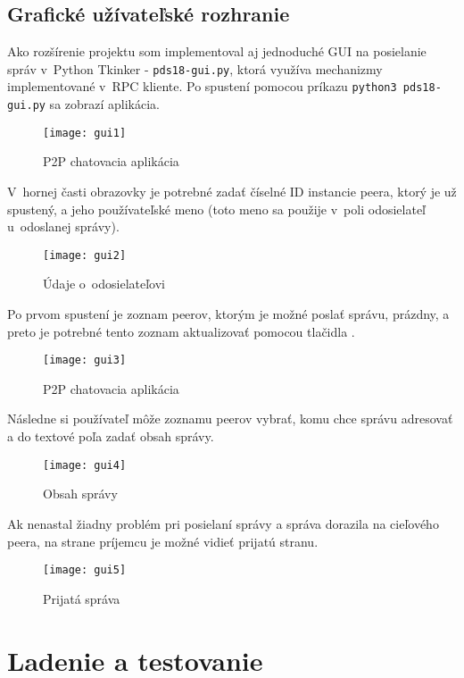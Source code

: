 \section{Grafické užívateľské rozhranie}

Ako rozšírenie projektu som implementoval aj jednoduché GUI na posielanie správ v~Python Tkinker \-- \texttt{pds18-gui.py}, ktorá využíva mechanizmy implementované v~RPC kliente. Po spustení pomocou príkazu \texttt{python3 pds18-gui.py} sa zobrazí aplikácia.

\begin{figure}[H]
	\texttt{[image: gui1]}
	\caption{P2P chatovacia aplikácia}
\end{figure}

V~hornej časti obrazovky je potrebné zadať číselné ID instancie peera, ktorý je už spustený, a jeho používateľské meno (toto meno sa použije v~poli odosielateľ u~odoslanej správy). 

\begin{figure}[H]
	\texttt{[image: gui2]}
	\caption{Údaje o~odosielateľovi}
\end{figure}

Po prvom spustení je zoznam peerov, ktorým je možné poslať správu, prázdny, a preto je potrebné tento zoznam aktualizovať pomocou tlačidla .

\begin{figure}[H]
	\texttt{[image: gui3]}
	\caption{P2P chatovacia aplikácia}
\end{figure}

Následne si používateľ môže zoznamu peerov vybrať, komu chce správu adresovať a do textové poľa zadať obsah správy.

\begin{figure}[H]
	\texttt{[image: gui4]}
	\caption{Obsah správy}
\end{figure}

Ak nenastal žiadny problém pri posielaní správy a správa dorazila na cieľového peera, na strane príjemcu je možné vidieť prijatú stranu.

\begin{figure}[H]
	\texttt{[image: gui5]}
	\caption{Prijatá správa}
\end{figure}

\chapter{Ladenie a testovanie}

